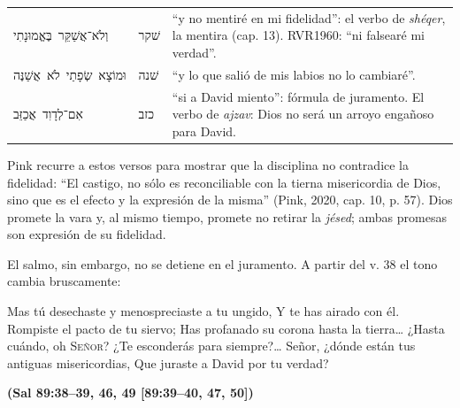 \documentclass[11pt,letterpaper]{article}
\newcommand{\heb}[1]{\mbox{\foreignlanguage{hebrew}{#1}}}
\newcommand{\SENOR}{\textsc{Señor}}
\newcommand{\fuente}[1]{\par\hfill{\upshape\bfseries\small\textcolor{azul}{#1}}}
\begin{document}
\begin{filologia}[Sal 89:33--35]
\begin{tabular}{@{}L{3.2cm}L{1.6cm}L{10cm}@{}}
\heb{וְלֹא־אֲשַׁקֵּר בֶּאֱמוּנָתִי} & \heb{שׁקר} & ``y no mentiré en mi fidelidad'': el verbo de \emph{shéqer}, la mentira (cap. 13). RVR1960: ``ni falsearé mi verdad''. \\[2pt]
\heb{וּמוֹצָא שְׂפָתַי לֹא אֲשַׁנֶּה} & \heb{שׁנה} & ``y lo que salió de mis labios no lo cambiaré''. \\[2pt]
\heb{אִם־לְדָוִד אֲכַזֵּב} & \heb{כזב} & ``si a David miento'': fórmula de juramento. El verbo de \emph{ajzav}: Dios no será un arroyo engañoso para David. \\
\end{tabular}
\end{filologia}

Pink recurre a estos versos para mostrar que la disciplina no contradice la fidelidad: ``El castigo, no sólo es reconciliable con la tierna misericordia de Dios, sino que es el efecto y la expresión de la misma'' (Pink, 2020, cap. 10, p. 57). Dios promete la vara y, al mismo tiempo, promete no retirar la \emph{jésed}; ambas promesas son expresión de su fidelidad.

El salmo, sin embargo, no se detiene en el juramento. A partir del v. 38 el tono cambia bruscamente:

\begin{cita}Mas tú desechaste y menospreciaste a tu ungido, Y te has airado con él. Rompiste el pacto de tu siervo; Has profanado su corona hasta la tierra\ldots{} ¿Hasta cuándo, oh \SENOR? ¿Te esconderás para siempre?\ldots{} Señor, ¿dónde están tus antiguas misericordias, Que juraste a David por tu verdad?\fuente{(Sal 89:38--39, 46, 49 [89:39--40, 47, 50])}\end{cita}
\end{document}
